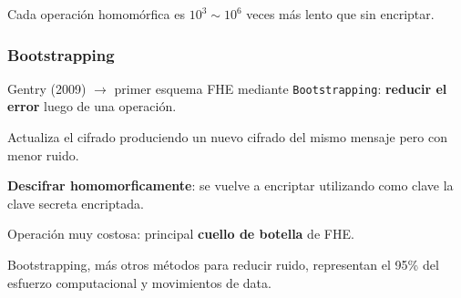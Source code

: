 \documentclass[10pt]{beamer}
\begin{document}
\begin{frame}
\begin{columns}
\end{columns}
\pause
        Cada operación homomórfica es $10^3 \sim 10^6$ veces más lento que sin  encriptar.


\end{frame}


\begin{frame}
\frametitle{Bootstrapping}
Gentry (2009) $\to$ primer  esquema FHE mediante \texttt{Bootstrapping}: \textbf{reducir el error} luego de una operación.

\pause
Actualiza el cifrado produciendo un nuevo cifrado del mismo mensaje pero con menor ruido.

\pause
\textbf{Descifrar homomorficamente}: se vuelve a encriptar utilizando como clave la clave secreta encriptada.

\pause
Operación muy costosa: principal \textbf{cuello de botella} de FHE.



\pause
\begin{mdframed}[backgroundcolor=frenchblue!20]
  Bootstrapping, más otros métodos para reducir ruido, representan el 95\% del esfuerzo computacional y movimientos de data.
\end{mdframed}
\end{frame}
\end{document}
